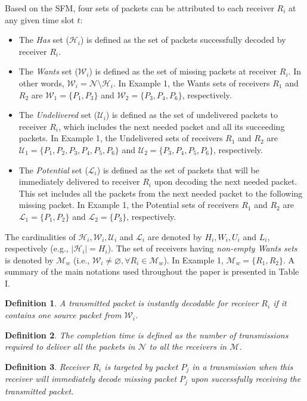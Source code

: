 \documentclass[12pt, peerreview, onecolumn]{IEEEtran}
\begin{document}
Based on the SFM, four sets of packets can be attributed to each receiver $R_i$ at any given time slot $t$:
\begin{itemize}
\item The \emph{Has} set ($\mathcal{H}_i$) is defined as the set of packets successfully decoded by receiver $R_i$.
\item The \emph{Wants} set ($\mathcal{W}_i$) is defined as the set of  missing packets at receiver $R_i$. In other words, $ \mathcal{W}_i = \mathcal{N}\setminus \mathcal{H}_i$. In Example 1, the Wants sets of receivers $R_1$ and $R_2$ are $\mathcal{W}_1 = \{P_1, P_3\}$ and $\mathcal{W}_2 = \{P_3, P_4, P_6\}$, respectively.
\item The \emph{Undelivered} set ($\mathcal{U}_i$) is defined as  the set of undelivered packets to receiver $R_i$, which includes  the next needed packet  and all its succeeding packets. In Example 1, the Undelivered sets of receivers $R_1$ and $R_2$ are $\mathcal{U}_1 = \{P_1,P_2,P_3, P_4,P_5,P_6\}$ and $\mathcal{U}_2 = \{P_3, P_4,P_5,P_6\}$, respectively.
\item The \emph{Potential} set ($\mathcal{L}_i$)  is defined as the set of  packets that will be immediately delivered to  receiver $R_i$ upon  decoding  the next needed packet. This set includes all the  packets from the next needed packet   to the following missing  packet.  In Example 1, the Potential sets of receivers $R_1$ and $R_2$ are $\mathcal{L}_1 = \{P_1, P_2\}$ and $\mathcal{L}_2 = \{P_3\}$, respectively.
\end{itemize}
The cardinalities of $\mathcal{H}_i, \mathcal{W}_i, \mathcal{U}_i$ and $\mathcal{L}_i$ are denoted  by $H_i, W_i, U_i$ and $L_i$, respectively  (e.g., $|\mathcal{H}_i| = H_i$).  The set of receivers having \emph{non-empty Wants sets} is denoted by $\mathcal M_w$ (i.e., $\mathcal{W}_i \neq \varnothing, \forall R_i \in \mathcal M_w$). In Example 1,  $\mathcal{M}_w = \{R_1, R_2\}$.  A summary of the main notations used throughout the paper is presented  in Table I.



\newtheorem{definitions}{\textbf{Definition}}
\begin{definitions}
\emph{A transmitted packet is instantly decodable for receiver $R_i$ if it contains one source packet from $\mathcal{W}_i$.}
\end{definitions}
\begin{definitions}
\emph{The completion time is defined as the number of transmissions required to deliver all the packets in $\mathcal{N}$ to all the receivers in $\mathcal{M}$.}
\end{definitions}
\begin{definitions}
\emph{Receiver $R_i$ is targeted by  packet $P_j $ in a  transmission  when this receiver  will immediately decode  missing packet $P_j$ upon  successfully receiving   the transmitted packet.}
\end{definitions}
\end{document}
